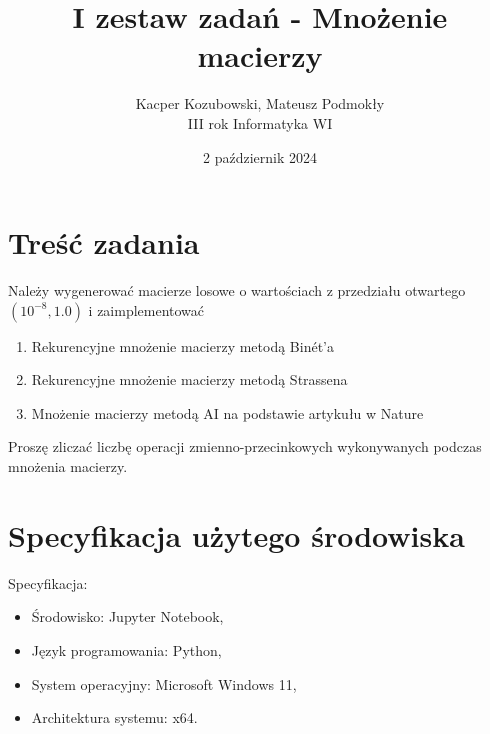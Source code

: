 \documentclass[11pt, leqno]{scrartcl}
\title{I zestaw zadań - Mnożenie macierzy}
\author{Kacper Kozubowski, Mateusz Podmokły \\ III
    rok Informatyka WI}
\date{2 październik 2024}
\begin{document}
    \maketitle
    \section{Treść zadania}
    Należy wygenerować macierze losowe o wartościach
    z przedziału otwartego $(10^{-8},1.0)$
    i zaimplementować
    \begin{enumerate}
        \item Rekurencyjne mnożenie macierzy metodą Binét'a
        \item Rekurencyjne mnożenie macierzy metodą Strassena
        \item Mnożenie macierzy metodą AI na podstawie
            artykułu w Nature
    \end{enumerate}
    Proszę zliczać liczbę operacji zmienno-przecinkowych
    wykonywanych podczas mnożenia macierzy.

    \section{Specyfikacja użytego środowiska}
    Specyfikacja:
    \begin{itemize}
        \item Środowisko: Jupyter Notebook,
        \item Język programowania: Python,
        \item System operacyjny: Microsoft Windows 11,
        \item Architektura systemu: x64.
    \end{itemize}
\end{document}
